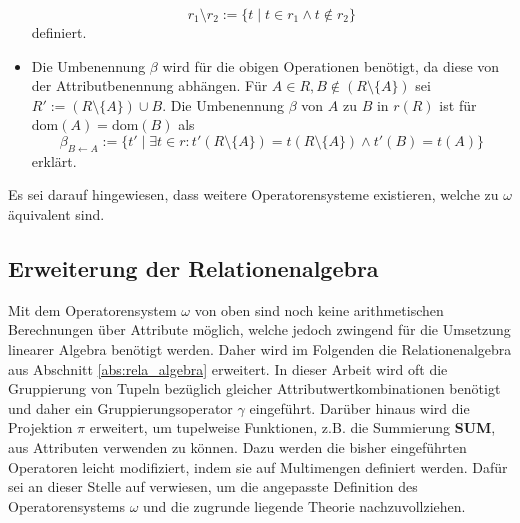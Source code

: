 \begin{itemize}
\begin{equation*}
        r_1 \setminus r_2:=\{ t \; | \; t \in r_1 \wedge t \notin r_2 \}
    \end{equation*}
    definiert.
    \item Die Umbenennung $\beta$ wird für die obigen Operationen benötigt, da diese von der Attributbenennung abhängen. Für $A \in R, B \notin (R \setminus \{A\})$ sei $R':=(R \setminus \{A\}) \cup B$. Die Umbenennung $\beta$ von $A$ zu $B$ in $r(R)$ ist für $\mathrm{dom}(A)=\mathrm{dom}(B)$ als
    \begin{equation*}
        \beta_{B \leftarrow A}:=\{t' \; | \; \exists t \in r: t'(R \setminus \{A\})=t(R \setminus \{A\}) \wedge t'(B)=t(A)\}
    \end{equation*}
    erklärt.
\end{itemize}
Es sei darauf hingewiesen, dass weitere Operatorensysteme existieren, welche zu $\omega$ äquivalent sind\cite{DBLP:books/daglib/0044627}.

\subsection*{Erweiterung der Relationenalgebra}

Mit dem Operatorensystem $\omega$ von oben sind noch keine arithmetischen Berechnungen über Attribute möglich, welche jedoch zwingend für die Umsetzung linearer Algebra benötigt werden. Daher wird im Folgenden die Relationenalgebra aus Abschnitt \ref{abs:rela_algebra} erweitert. In dieser Arbeit wird oft die Gruppierung von Tupeln bezüglich gleicher Attributwertkombinationen benötigt und daher ein Gruppierungsoperator $\gamma$ eingeführt. Darüber hinaus wird die Projektion $\pi$ erweitert, um tupelweise Funktionen, z.B. die Summierung \textbf{SUM}, aus Attributen verwenden zu können.
Dazu werden die bisher eingeführten Operatoren leicht modifiziert, indem sie auf Multimengen definiert werden. Dafür sei an dieser Stelle auf \cite{DBLP:books/daglib/0020812} verwiesen, um die angepasste Definition des Operatorensystems $ \omega$ und die zugrunde liegende Theorie nachzuvollziehen.
